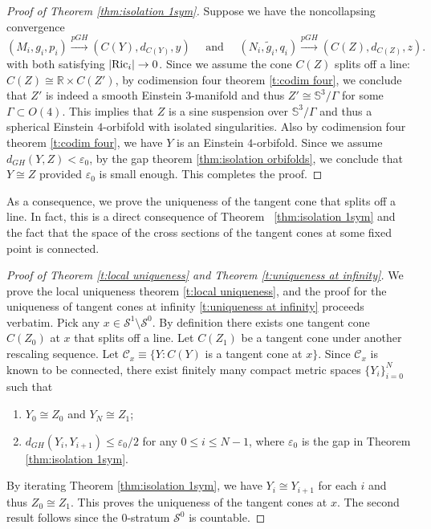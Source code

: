 \documentclass[11pt,reqno]{amsart}
\numberwithin{equation}{section}
\newcommand{\RR}{\mathds{R}}
\newcommand{\Ric}{{\rm Ric}}
\newcommand{\cC}{\mathcal{C}}
\newcommand{\cS}{\mathcal{S}}
\theoremstyle{definition}
\theoremstyle{remark}
\begin{document}
\begin{proof}[Proof of Theorem \ref{thm:isolation 1sym}]
    Suppose we have the noncollapsing convergence
    \begin{equation*}
    (M_i, g_i, p_i) \xrightarrow{pGH} (C(Y), d_{C(Y)}, y) \quad \text{ and }  \quad (N_i, \tilde{g}_i, q_i) \xrightarrow{pGH} (C(Z), d_{C(Z)}, z).
\end{equation*}
with both satisfying $|\Ric_i| \to 0$. Since we assume the cone $C(Z)$ splits off a line: $C(Z) \cong \RR \times C(Z')$, by codimension four theorem \ref{t:codim four}, we conclude that $Z'$ is indeed a smooth Einstein $3$-manifold and thus $Z' \cong \mathbb{S}^3/\Gamma$ for some $\Gamma \subset O(4)$. This implies that $Z$ is a sine suspension over $\mathbb{S}^3/\Gamma$ and thus a spherical Einstein $4$-orbifold with isolated singularities. Also by codimension four theorem \ref{t:codim four}, we have $Y$ is an Einstein $4$-orbifold. Since we assume $d_{GH}(Y,Z) < \varepsilon_0$, by the gap theorem \ref{thm:isolation orbifolds}, we conclude that $Y \cong Z$ provided $\varepsilon_0$ is small enough. This completes the proof.
\end{proof}

As a consequence, we prove the uniqueness of the tangent cone that splits off a line. In fact, this is a direct consequence of Theorem~ \ref{thm:isolation 1sym} and the fact that the space of the cross sections of the tangent cones at some fixed point is connected.  

\begin{proof}[Proof of Theorem \ref{t:local uniqueness} and Theorem \ref{t:uniqueness at infinity}]
    We prove the local uniqueness theorem \ref{t:local uniqueness}, and the proof for the uniqueness of tangent cones at infinity \ref{t:uniqueness at infinity} proceeds verbatim. Pick any $x \in \cS^1 \setminus \cS^0$. By definition there exists one tangent cone $C(Z_0)$ at $x$ that splits off a line. Let $C(Z_1)$ be a tangent cone under another rescaling sequence. Let $\cC_x \equiv \{ Y: C(Y)$ is a tangent cone at $x \}$. Since $\cC_x$ is known to be connected, there exist finitely many compact metric spaces $\{Y_i\}_{i=0}^N$ such that
    \begin{enumerate}
        \item $Y_0 \cong Z_0$ and $Y_N \cong Z_1$;
        \item $d_{GH}(Y_i, Y_{i+1}) \leqslant \varepsilon_0/2$ for any $0\leqslant i \leqslant N-1$, where $\varepsilon_0$ is the gap in Theorem \ref{thm:isolation 1sym}.
     \end{enumerate}

By iterating Theorem \ref{thm:isolation 1sym}, we have $Y_i \cong Y_{i+1}$ for each $i$ and thus $Z_0 \cong Z_1$. This proves the uniqueness of the tangent cones at $x$. The second result follows since the $0$-stratum $\cS^0$ is countable. 
\end{proof}
\end{document}
